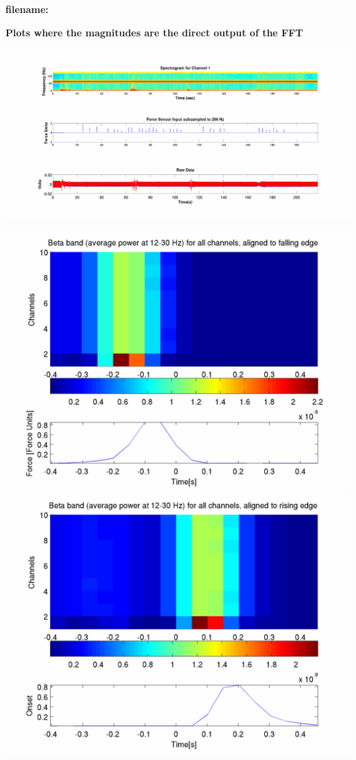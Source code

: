 \documentclass[12pt]{article}
\begin{document}
\begin{center}
\textbf{filename: \expandafter\detokenize\expandafter{\myvar}}

\textbf{Plots where the magnitudes are the direct output of the FFT}
\end{center}

\includegraphics[scale=0.14]{raw_data_spectrogram.png}

\includegraphics[scale=0.2]{beta_falling.png}
\includegraphics[scale=0.2]{beta_rising.png}
\end{document}
